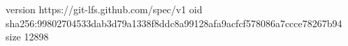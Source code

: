 version https://git-lfs.github.com/spec/v1
oid sha256:99802704533dab3d79a1338f8ddc8a99128afa9acfcf578086a7ccce78267b94
size 12898

